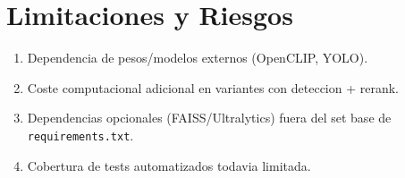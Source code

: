 \section{Limitaciones y Riesgos}

\begin{enumerate}
  \item Dependencia de pesos/modelos externos (OpenCLIP, YOLO).
  \item Coste computacional adicional en variantes con deteccion + rerank.
  \item Dependencias opcionales (FAISS/Ultralytics) fuera del set base de \texttt{requirements.txt}.
  \item Cobertura de tests automatizados todavia limitada.
\end{enumerate}
